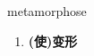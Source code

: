 
\begin{frame}
{\huge metamorphose}
\begin{center}
\begin{enumerate}\Large
  \item \textbf{(使)变形}
\end{enumerate}
\end{center}
\end{frame}
